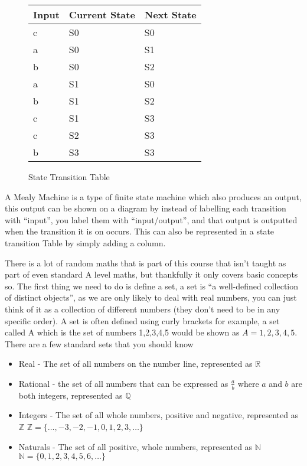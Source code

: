   \begin{figure}[H]
    \centering
    \begin{tabular}{| C{4cm} | C{4cm} | C{4cm} |}
      \hline
      Input & Current State & Next State \\
      \hline
      c & S0 & S0 \\
      a & S0 & S1 \\
      b & S0 & S2 \\
      a & S1 & S0 \\
      b & S1 & S2 \\
      c & S1 & S3 \\
      c & S2 & S3 \\
      b & S3 & S3 \\
      \hline
    \end{tabular}
    \caption*{State Transition Table}
  \end{figure}
  A Mealy Machine is a type of finite state machine which also produces an output, this output can be shown on a diagram by instead of labelling each transition with ``input'', you label them with ``input/output'', and that output is outputted when the transition it is on occurs. This can also be represented in a state transition Table by simply adding a column.
  
  \noindent
  There is a lot of random maths that is part of this course that isn't taught as part of even standard A level maths, but thankfully it only covers basic concepts so. The first thing we need to do is define a set, a set is ``a well-defined collection of distinct objects'', as we are only likely to deal with real numbers, you can just think of it as a collection of different numbers (they don't need to be in any specific order). A set is often defined using curly brackets for example, a set called A which is the set of numbers 1,2,3,4,5 would be shown as $A = {1,2,3,4,5}$.
  There are a few standard sets that you should know
  \begin{itemize}
  	\item Real - The set of all numbers on the number line, represented as $\mathbb{R}$
  	\item Rational - the set of all numbers that can be expressed as $\frac{a}{b}$ where $a$ and $b$ are both integers, represented as $\mathbb{Q}$
  	\item Integers - The set of all whole numbers, positive and negative, represented as $\mathbb{Z}$
	  	\subitem $\mathbb{Z} = \{\dots,-3,-2,-1,0,1,2,3,\dots\}$
  	\item Naturals - The set of all positive, whole numbers, represented as $\mathbb{N}$
	  	\subitem $\mathbb{N} = \{0,1,2,3,4,5,6,\dots\}$
  \end{itemize}
  
